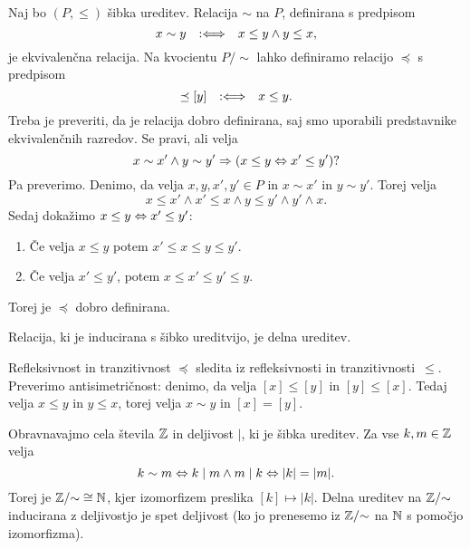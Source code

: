 Naj bo $(P, \leq)$ šibka ureditev. Relacija $\sim$ na $P$, definirana s predpisom
%
\begin{equation*}
  x \sim y \quad {{:}{\Longleftrightarrow}}\quad x \leq y \land y \leq x,
\end{equation*}
%
je ekvivalenčna relacija. Na kvocientu $P/{\sim}$ lahko definiramo relacijo $\preceq$ s
predpisom
%
\begin{equation*}
  [x] \preceq [y] \defiff x \leq y.
\end{equation*}
%
Treba je preveriti, da je relacija dobro definirana, saj smo uporabili predstavnike ekvivalenčnih razredov. Se pravi, ali velja
\begin{equation*}
  x \sim x' \land y \sim y' \Rightarrow (x \leq y \Leftrightarrow x' \leq y') ?
\end{equation*}
%
Pa preverimo. Denimo, da velja $x, y, x', y' \in P$ in $x \sim x'$ in $y \sim y'$.
Torej velja
\begin{equation*}
  x \leq x' \land x' \leq x \land y \leq y' \land y' \land x.
\end{equation*}
%
Sedaj dokažimo $x \leq y \Leftrightarrow x' \leq y'$:
%
\begin{enumerate}
\item Če velja $x \leq y$ potem $x' \leq x \leq y \leq y'$.
\item Če velja $x' \leq y'$, potem $x \leq x' \leq y' \leq y$.
\end{enumerate}
%
Torej je $\preceq$ dobro definirana.

\begin{izjava}
  Relacija, ki je inducirana s šibko ureditvijo, je delna ureditev.
\end{izjava}

\begin{dokaz}
  Refleksivnost in tranzitivnost $\preceq$ sledita iz refleksivnosti in tranzitivnosti~$\leq$. Preverimo antisimetričnost: denimo, da velja $[x] \leq [y]$ in $[y] \leq [x]$. Tedaj velja $x \leq y$ in $y \leq x$, torej velja $x \sim y$ in $[x] = [y]$.
\end{dokaz}

\begin{primer}
  Obravnavajmo cela števila $\mathbb{Z}$ in deljivost $\mid$, ki je šibka
  ureditev. Za vse $k, m \in \mathbb{Z}$ velja
  \begin{equation*}
    k \sim m \Leftrightarrow k \mid m \land m \mid k \Leftrightarrow |k| = |m|.
  \end{equation*}
  Torej je $\mathbb{Z}/{\sim} \cong \mathbb{N}$, kjer izomorfizem preslika $[k] \mapsto |k|$. Delna ureditev na $\mathbb{Z}/{\sim}$ inducirana z deljivostjo je spet deljivost (ko jo prenesemo iz $\mathbb{Z}/{\sim}$ na $\mathbb{N}$ s pomočjo izomorfizma).
\end{primer}


